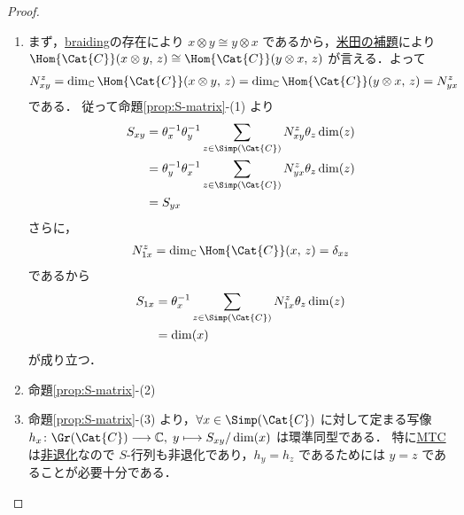 \documentclass[TQFT_main]{subfiles}
\begin{document}
\begin{proof}
    \begin{enumerate}
        \item まず，\hyperref[redef:braided-monoidal]{braiding}の存在により $x \otimes y \cong y \otimes x$ であるから，\hyperref[col:Yoneda]{米田の補題}により $\Hom{\Cat{C}}(x \otimes y,\, z) \cong \Hom{\Cat{C}}(y \otimes x,\, z)$ が言える．よって
        \begin{align}
            N^z_{xy} = \dim_{\mathbb{C}}\Hom{\Cat{C}}(x \otimes y,\, z) = \dim_{\mathbb{C}}\Hom{\Cat{C}}(y \otimes x,\, z) = N^z_{yx}
        \end{align}
        である．
        従って命題\ref{prop:S-matrix}-(1) より
        \begin{align}
            S_{xy} 
            &= \theta_x^{-1} \theta_y^{-1} \sum_{z \in \Simp(\Cat{C})} N^z_{xy} \theta_z \dim (z) \\
            &= \theta_y^{-1}\theta_x^{-1}  \sum_{z \in \Simp(\Cat{C})} N^z_{yx} \theta_z \dim (z) \\
            &= S_{yx}
        \end{align}
        さらに，
        \begin{align}
            N^z_{1x} = \dim_{\mathbb{C}} \Hom{\Cat{C}} (x,\, z) = \delta_{xz}
        \end{align}
        であるから
        \begin{align}
            S_{1x} 
            &= \theta_x^{-1} \sum_{z \in \Simp(\Cat{C})} N^z_{1x} \theta_z \dim (z) \\
            &= \dim (x)
        \end{align}
        が成り立つ．
        \item 命題\ref{prop:S-matrix}-(2)
        \item 命題\ref{prop:S-matrix}-(3) より，$\forall x \in \Simp(\Cat{C})$ に対して定まる写像 $h_x \colon \Gr(\Cat{C}) \lto \mathbb{C},\; y \lmto S_{xy} / \dim(x)$ は環準同型である．
        特に\hyperref[def:MTC]{MTC}は\hyperref[def:nondegen-BFC]{非退化}なので $S$-行列も非退化であり，$h_y = h_z$ であるためには $y=z$ であることが必要十分である．


\end{enumerate}
\end{proof}
\end{document}
